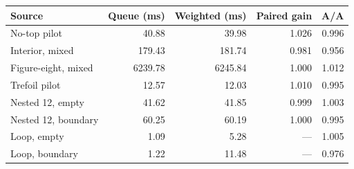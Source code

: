 \begin{center}
\small
\begin{tabular}{lrrrr}
\toprule
Source & Queue (ms) & Weighted (ms) & Paired gain & A/A \\
\midrule
No-top pilot & 40.88 & 39.98 & 1.026 & 0.996 \\
Interior, mixed & 179.43 & 181.74 & 0.981 & 0.956 \\
Figure-eight, mixed & 6239.78 & 6245.84 & 1.000 & 1.012 \\
Trefoil pilot & 12.57 & 12.03 & 1.010 & 0.995 \\
Nested 12, empty & 41.62 & 41.85 & 0.999 & 1.003 \\
Nested 12, boundary & 60.25 & 60.19 & 1.000 & 0.995 \\
Loop, empty & 1.09 & 5.28 & --- & 1.005 \\
Loop, boundary & 1.22 & 11.48 & --- & 0.976 \\
\bottomrule
\end{tabular}
\end{center}
